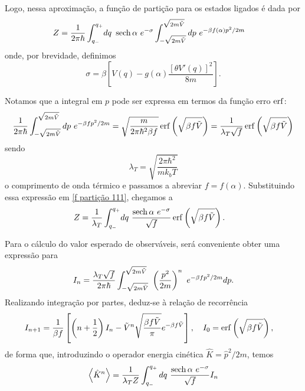 \documentclass[
	12pt,
	oneside,			%
	a4paper,			%
	english,			%
	brazil				%
	]{abntex2}
\theoremstyle{definition}
\begin{document}
Logo, nessa aproximação, a função de partição para os estados ligados é dada por
\begin{equation}
\label{f partição 111}
    \begin{aligned}
        Z = \frac{1}{2\pi \hbar}\int_{q_-}^{q_+} & dq \ \sech{\alpha} \ e^{-\sigma} \int_{-\sqrt{2m\Tilde{V}}}^{\sqrt{2m\Tilde{V}}} dp \ e^{-\beta f(\alpha)p^2/2m}  
    \end{aligned}
\end{equation}
onde, por brevidade, definimos
\begin{equation}
    \sigma = \beta \left[V(q) - g(\alpha) \frac{{\left[\theta V'(q) \right]}^2}{8m} \right].
\end{equation}

Notamos que a integral em $p$ pode ser expressa em termos da função erro $\erf$:
\begin{equation}
    \frac{1}{2\pi \hbar}\int_{-\sqrt{2m\Tilde{V}}}^{\sqrt{2m\Tilde{V}}} dp \ e^{-\beta fp^2/2m} = \sqrt{\frac{ m}{2\pi \hbar^2 \beta f}} \erf \left( \sqrt{\beta f \Tilde{V}} \right) =  \frac{ 1}{ \lambda_T \sqrt{f}} \erf \left( \sqrt{\beta f \Tilde{V}} \right)
\end{equation}
sendo
\begin{equation}
    \lambda_T = \sqrt{\frac{2\pi \hbar^2}{m k_b T}}
\end{equation}
o comprimento de onda térmico e passamos a abreviar $f = f(\alpha)$. Substituindo essa expressão em \eqref{f partição 111}, chegamos a
\begin{equation}
    \begin{aligned}
        Z = \frac{1}{\lambda_T}\int_{q_-}^{q_+} & dq \ \frac{\sech{\alpha} \  e^{-\sigma}}{\sqrt{f}} \erf \left( \sqrt{\beta f \Tilde{V}} \right).
    \end{aligned}
\end{equation}

Para o cálculo do valor esperado de observáveis, será conveniente obter uma expressão para
\begin{equation}
    I_n = \frac{\lambda_T \sqrt{f}}{2\pi \hbar}\int_{-\sqrt{2m\Tilde{V}}}^{\sqrt{2m\Tilde{V}}} \ \left( \frac{p^2}{2m} \right)^n \ e^{-\beta fp^2/2m} dp.
\end{equation}
Realizando integração por partes, deduz-se à relação de recorrência
\begin{equation}
    \begin{aligned}
        I_{n+1} &= \frac{1}{\beta f} \left[ \left(n + \frac{1}{2} \right)I_{n} - \tilde{V}^n \sqrt{\frac{\beta f \Tilde{V}}{\pi}} e^{-\beta f\Tilde{V}} \right], \ \ \ I_0 = \erf \left( \sqrt{\beta f \Tilde{V}} \right),
    \end{aligned}
\end{equation}
de forma que, introduzindo o operador energia cinética $\hat{K} = \hat{p}^2/2m$, temos
\begin{equation}
    \expval{\hat{K}^n} = \frac{1}{\lambda_T Z}  \int_{q_-}^{q_+}  dq \ \frac{\sech{\alpha} \  e^{-\sigma}}{\sqrt{f}} I_n
\end{equation}
\end{document}
